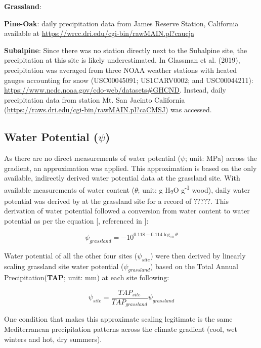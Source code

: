 \documentclass[letterpaper, 10pt]{article}
\begin{document}
\textbf{Grassland}:

\textbf{Pine-Oak}: daily precipitation data from James Reserve Station, California available at \url{https://wrcc.dri.edu/cgi-bin/rawMAIN.pl?caucja}

\textbf{Subalpine}: Since there was no station directly next to the Subalpine site, the precipitation at this site is likely underestimated. In Glassman et al. (2019), precipitation was averaged from three NOAA weather stations with heated gauges accounting for snow (USC00045091; US1CARV0002; and USC00044211): \url{https://www.ncdc.noaa.gov/cdo-web/datasets#GHCND}. Instead, daily precipitation data from station Mt. San Jacinto California (\url{https://raws.dri.edu/cgi-bin/rawMAIN.pl?caCMSJ}) was accessed.


\subsection{Water Potential ($\psi$)}
As there are no direct measurements of water potential ($\psi$; unit: MPa) across the gradient, an approximation was applied. This approximation is based on the only available, indirectly derived water potential data at the grassland site. With available measurements of water content ($\theta$; unit: g H\textsubscript{2}O g\textsuperscript{-1} wood), daily water potential was derived by \citet{allison2017consequences} at the grassland site for a record of $?????$. This derivation of water potential followed a conversion from water content to water potential as per the equation [\citet{dix1985changes}, referenced in \citet{allison2017consequences}]:

\begin{equation}
  \psi_{grassland} = -10^{0.118-0.114\log_{10} \theta}
\end{equation}

Water potential of all the other four sites ($\psi_{site}$) were then derived by linearly scaling grassland site water potential ($\psi_{grassland}$) based on the Total Annual Precipitation(\textbf{TAP}; unit: mm) at each site following:

\begin{equation}
  \psi_{site} = \frac{TAP_{site}}{TAP_{grassland}} \psi_{grassland}
\end{equation}

One condition that makes this approximate scaling legitimate is the same Mediterranean precipitation patterns across the climate gradient (cool, wet winters and hot, dry summers).
\end{document}
